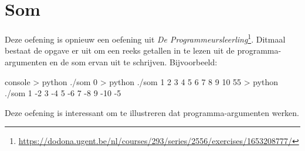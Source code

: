 \inputminted{json}{sources/division-plan.tson}

\section{Som}\label{sec:oefeningen-som}

Deze oefening is opnieuw een oefening uit \emph{De Programmeursleerling}\footnote{\url{https://dodona.ugent.be/nl/courses/293/series/2556/exercises/1653208777/}}.
Ditmaal bestaat de opgave er uit om een reeks getallen in te lezen uit de programma-argumenten en de som ervan uit te schrijven.
Bijvoorbeeld:

\begin{mintend}{console}
> python ./som
0
> python ./som 1 2 3 4 5 6 7 8 9 10
55
> python ./som 1 -2 3 -4 5 -6 7 -8 9 -10
-5
\end{mintend}

Deze oefening is interessant om te illustreren dat programma-argumenten werken.


